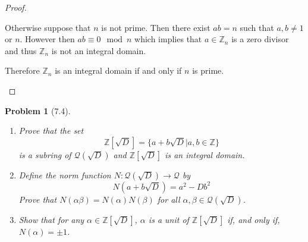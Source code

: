 \documentclass[10pt]{article}
\newcommand{\sk}{\vskip 10mm}
\newcommand{\bb}[1]{\mathbb{#1}}
\theoremstyle{plain}
\newtheorem{problem}{Problem}
\theoremstyle{remark}
\begin{document}
\begin{proof}
\begin{enumerate}
    Otherwise suppose that $n$ is not prime. Then there exist $ab=n$
    such that $a,b\neq 1$ or $n$. However then $ab\equiv 0 \mod n$ which implies
    that $a\in \bb{Z}_n$ is a zero divisor and thus $\bb{Z}_n$ is not an
    integral domain.

    Therefore $\bb{Z}_n$ is an integral domain if and only if $n$ is prime.
  \end{enumerate}
\end{proof}

\sk

\begin{problem}[7.4]
  \begin{enumerate}
  \item Prove that the set
    \[ \bb{Z}[\sqrt{D}]=\{a+b\sqrt{D}|a,b\in\bb{Z}\}\]
    is a subring of $\mathcal{Q}(\sqrt{D})$ and
    $\bb{Z}[\sqrt{D}]$ is an integral domain.
  \item Define the norm function $N:\mathcal{Q}(\sqrt{D})\rightarrow\mathcal{Q}$ by
    \[ N(a+b\sqrt{D})=a^2-Db^2\]
    Prove that $N(\alpha\beta)=N(\alpha)N(\beta)$ for all $\alpha,\beta\in\mathcal{Q}(\sqrt{D})$.
  \item Show that for any $\alpha\in\bb{Z}[\sqrt{D}]$, $\alpha$ is a unit of
    $\bb{Z}[\sqrt{D}]$ if, and only if, $N(\alpha)=\pm 1$.
  \end{enumerate}
\end{problem}
\end{document}
